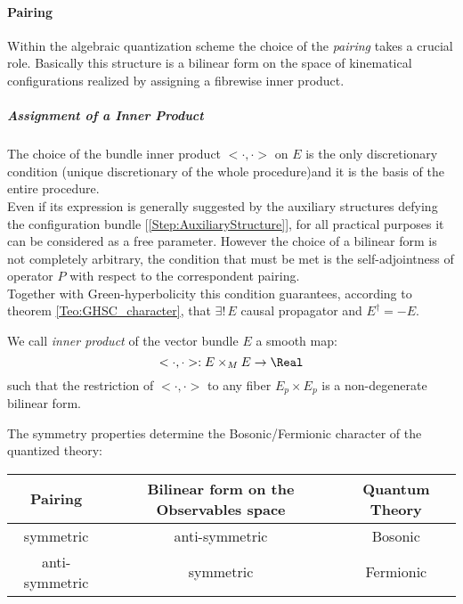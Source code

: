 \documentclass[Main]{subfiles}
\begin{document}
		\paragraph{Pairing}\label{Paragraph:Pairing Construction}
				Within the algebraic quantization scheme the choice of the \emph{pairing} takes a crucial role.
				Basically this structure is a bilinear form on the space of kinematical configurations realized by assigning a fibrewise inner product.

			\subparagraph{Assignment of a Inner Product}
				The choice of the bundle inner product  $<\cdot,\cdot>$ on $E$ is the only discretionary condition \ifToninus(unique discretionary  of the whole procedure)\fi and it is the basis of the entire procedure.\\
				Even if its expression is generally suggested by the auxiliary structures defying the configuration bundle [\ref{Step:AuxiliaryStructure}], for all practical purposes it can be considered as a free parameter.
				However the choice of a bilinear form is not completely arbitrary, the condition that must be met is the self-adjointness of operator $P$ with respect to the correspondent pairing.\\
				Together with Green-hyperbolicity this condition guarantees, according to theorem \ref{Teo:GHSC_character}, that $\exists ! \, E$ causal propagator and $E^\dagger =  -E$.
			\begin{definition}%
				We call \emph{inner product} of the vector bundle $E$ a smooth map:
				\begin{displaymath}
					<\cdot,\cdot> : E \times_M E \rightarrow \Real
				\end{displaymath}
				such that the restriction of $<\cdot,\cdot>$ to any fiber $E_p\times E_p$ is a non-degenerate bilinear form.
			\end{definition}

				The
				symmetry properties determine the Bosonic/Fermionic character of the quantized theory:\\
				\begin{center}
				\begin{tabular}{|c | c | c|}
					\hline
					Pairing & Bilinear form on the Observables space & Quantum Theory\\
					\hline
					symmetric  & anti-symmetric &  Bosonic \\
					anti-symmetric & symmetric & Fermionic \\
					\hline
				\end{tabular}
				\end{center}
\end{document}
